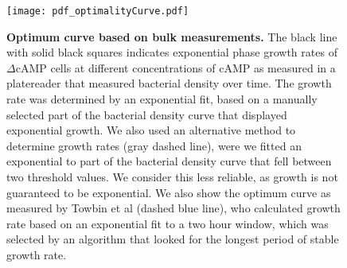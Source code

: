\begingroup %
\begin{figure}
    \centering
    \texttt{[image: pdf\_optimalityCurve.pdf]}
    \caption{ 
        \textbf{Optimum curve based on bulk measurements.}
        The black line with solid black squares indicates
        exponential phase growth rates of $\Delta$cAMP cells at different concentrations of cAMP as measured in a platereader that measured bacterial density over time.
        The growth rate was determined by an exponential fit, based on a manually selected part of the bacterial density curve that displayed exponential growth.
        We also used an alternative method to determine growth rates (gray dashed line), were we 
        fitted an exponential to part of the bacterial density curve that fell between two threshold values.
        We consider this less reliable, as growth is not guaranteed to be exponential.
        We also show the optimum curve as measured by Towbin et al \cite{Towbin2017} (dashed blue line),
        who calculated growth rate based on an exponential fit to a two hour window,
        which was selected by an algorithm that looked for the longest period of stable growth rate.        
    }
    \label{fig:CRP:ocurvePlatereader}
\end{figure}
\endgroup



